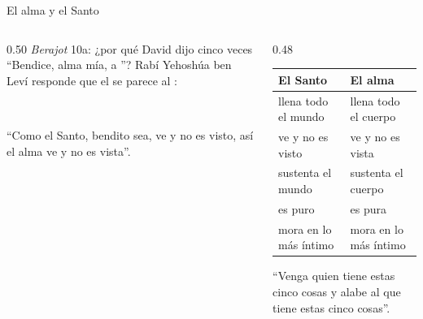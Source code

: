 \begin{frame}{El alma y el Santo}
\begin{columns}[t,onlytextwidth]
\begin{column}{0.50\textwidth}\small
\emph{Berajot} 10a: ¿por qué David dijo cinco veces ``Bendice, alma mía, a \SENOR''? Rabí Yehoshúa ben Leví responde que el  se parece al :
\begin{center}\scriptsize{}\\ \end{center}
``Como el Santo, bendito sea, ve y no es visto, así el alma ve y no es vista''.
\end{column}
\begin{column}{0.48\textwidth}\scriptsize\renewcommand{\arraystretch}{1.12}
\begin{tabular}{@{}>{\RaggedRight\arraybackslash}p{2.6cm}>{\RaggedRight\arraybackslash}p{2.8cm}@{}}
\toprule
\textbf{El Santo} & \textbf{El alma} \\ \midrule
llena todo el mundo & llena todo el cuerpo \\
ve y no es visto & ve y no es vista \\
sustenta el mundo & sustenta el cuerpo \\
es puro & es pura \\
mora en lo más íntimo & mora en lo más íntimo \\
\bottomrule
\end{tabular}\par\smallskip
``Venga quien tiene estas cinco cosas y alabe al que tiene estas cinco cosas''.
\end{column}
\end{columns}\par\smallskip
{}
\end{frame}

